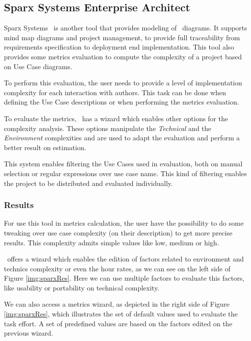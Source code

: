 \subsection{Sparx Systems Enterprise Architect}
Sparx Systems \entArch~is another tool that provides modeling of \uml\ diagrams.
It supports mind map diagrams and project management, to provide full traceability from requirements specification to deployment end implementation.
This tool also provides some metrics evaluation to compute the complexity of a project based on Use Case diagrams. 

To perform this evaluation, the user needs to provide a level of implementation complexity for each interaction with authors. 
This task can be done when defining the Use Case descriptions or when performing the metrics evaluation.

To evaluate the metrics, \entArch~has a wizard which enables other options for the complexity analysis.
These options manipulate the \emph{Technical} and the \emph{Environment} complexities and are used to adapt the evaluation and perform a better result on estimation.

This system enables filtering the Use Cases used in evaluation, both on manual selection or regular expressions over use case name.
This kind of filtering enables the project to be distributed and evaluated individually.

\subsubsection{Results}
For use this tool in metrics calculation, the user have the possibility to do some tweaking over use case complexity (on their description) to get more precise results.
This complexity admits simple values like low, medium or high.

\entArch~offers a wizard which enables the edition of factors related to environment and technics complexity or even the hour rates, as we can see on the left side of Figure \ref{img:sparxRes}.
Here we can use multiple factors to evaluate this factors, like usability or portability on technical complexity.

We can also access a metrics wizard, as depicted in the right side of Figure \ref{img:sparxRes}, which illustrates the set of default values used to evaluate the task effort.
A set of predefined values are based on the factors edited on the previous wizard.

